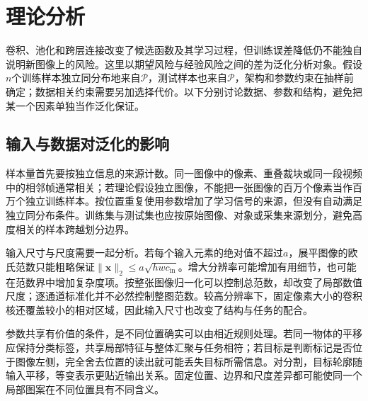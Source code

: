 \FloatBarrier

\section{理论分析}
\label{sec:cnn-theory}

卷积、池化和跨层连接改变了候选函数及其学习过程，但训练误差降低仍不能独自说明新图像上的风险。这里以期望风险与经验风险之间的差为泛化分析对象。假设$n$个训练样本独立同分布地来自$\mathcal P$，测试样本也来自$\mathcal P$，架构和参数约束在抽样前确定；数据相关约束需要另加选择代价。以下分别讨论数据、参数和结构，避免把某一个因素单独当作泛化保证。

\subsection{输入与数据对泛化的影响}
\label{sec:cnn-data-generalization}

样本量首先要按独立信息的来源计数。同一图像中的像素、重叠裁块或同一段视频中的相邻帧通常相关；若理论假设独立图像，不能把一张图像的百万个像素当作百万个独立训练样本。按位置重复使用参数增加了学习信号的来源，但没有自动满足独立同分布条件。训练集与测试集也应按原始图像、对象或采集来源划分，避免高度相关的样本跨越划分边界。

输入尺寸与尺度需要一起分析。若每个输入元素的绝对值不超过$a$，展平图像的欧氏范数只能粗略保证$\lVert\bm x\rVert_2\leq a\sqrt{hwc_{\mathrm{in}}}$。增大分辨率可能增加有用细节，也可能在范数界中增加复杂度项。按整张图像归一化可以控制总范数，却改变了局部数值尺度；逐通道标准化并不必然控制整图范数。较高分辨率下，固定像素大小的卷积核还覆盖较小的相对区域，因此输入尺寸也改变了结构与任务的配合。

参数共享有价值的条件，是不同位置确实可以由相近规则处理。若同一物体的平移应保持分类标签，共享局部特征与整体汇聚与任务相符；若目标是判断标记是否位于图像左侧，完全舍去位置的读出就可能丢失目标所需信息。对分割，目标轮廓随输入平移，等变表示更贴近输出关系。固定位置、边界和尺度差异都可能使同一个局部图案在不同位置具有不同含义。

